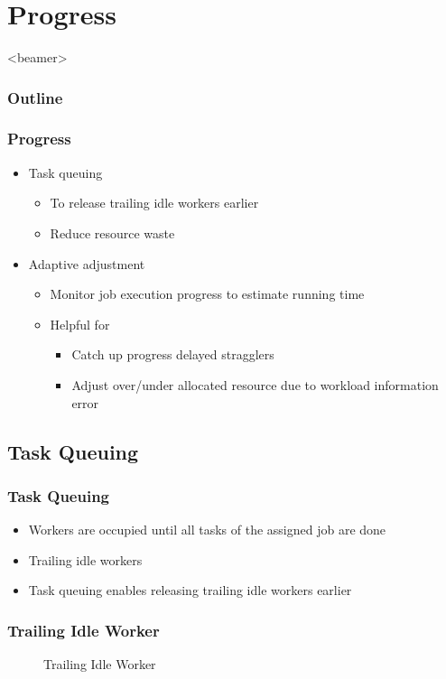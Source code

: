 \documentclass{beamer}
\begin{document}
\section{Progress}
\begin{frame}<beamer>
  \frametitle{Outline}
  \tableofcontents[
    currentsubsection,
    sectionstyle=show/shaded,
    subsectionstyle=show/show/shaded,
  ]
\end{frame}
\begin{frame}
  \frametitle{Progress}
  \begin{itemize}
    \item Task queuing
      \begin{itemize}
        \item To release trailing idle workers earlier
        \item Reduce resource waste
      \end{itemize}
    \item Adaptive adjustment
      \begin{itemize}
        \item Monitor job execution progress to estimate running time
        \item Helpful for
          \begin{itemize}
            \item Catch up progress delayed stragglers
            \item Adjust over/under allocated resource due to workload
              information error
          \end{itemize}
      \end{itemize}
  \end{itemize}
\end{frame}
\subsection{Task Queuing}
\begin{frame}
  \frametitle{Task Queuing}
  \begin{itemize}
    \item Workers are occupied until all tasks of the assigned job are
      done
    \item Trailing idle workers
    \item Task queuing enables releasing trailing idle workers earlier
  \end{itemize}
\end{frame}

\begin{frame}
  \frametitle{Trailing Idle Worker}

  \begin{figure}[h]
    \centering
    \resizebox{\textheight}{!}{
      
    }
    \caption{Trailing Idle Worker}
  \end{figure}
\end{frame}
\end{document}
